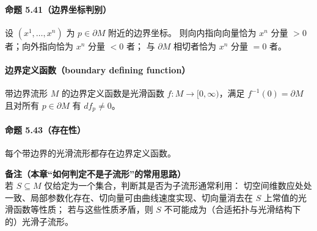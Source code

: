 \documentclass[11pt,a4paper]{article}
\begin{document}
\paragraph{命题 5.41（边界坐标判别）}
设 $(x^1,\dots,x^n)$ 为 $p\in\partial M$ 附近的边界坐标。
则向内指向向量恰为 $x^n$ 分量 $>0$ 者；向外指向恰为 $x^n$ 分量 $<0$ 者；
与 $\partial M$ 相切者恰为 $x^n$ 分量 $=0$ 者。

\paragraph{边界定义函数（boundary defining function）}
带边界流形 $M$ 的边界定义函数是光滑函数 $f:M\to[0,\infty)$，满足
$f^{-1}(0)=\partial M$ 且对所有 $p\in\partial M$ 有 $df_p\neq 0$。

\paragraph{命题 5.43（存在性）}
每个带边界的光滑流形都存在边界定义函数。

\bigskip
\noindent\textbf{备注（本章“如何判定不是子流形”的常用思路）}\\
若 $S\subseteq M$ 仅给定为一个集合，判断其是否为子流形通常利用：
切空间维数应处处一致、局部参数化存在、切向量可由曲线速度实现、切向量消去在 $S$ 上常值的光滑函数等性质；
若与这些性质矛盾，则 $S$ 不可能成为（合适拓扑与光滑结构下的）光滑子流形。
\end{document}
